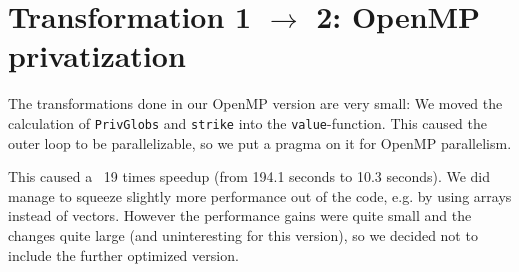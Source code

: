 \section{Transformation 1 $\rightarrow$ 2: OpenMP privatization}

The transformations done in our OpenMP version are very small: We
moved the calculation of \texttt{PrivGlobs} and \texttt{strike} into
the \texttt{value}-function. This caused the outer loop to be
parallelizable, so we put a pragma on it for OpenMP parallelism.

This caused a ~19 times speedup (from 194.1 seconds to 10.3 seconds).
We did manage to squeeze slightly more performance out of the code,
e.g. by using arrays instead of vectors. However the performance gains
were quite small and the changes quite large (and uninteresting for this
version), so we decided not to include the further optimized version.

